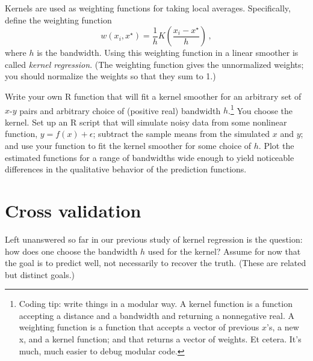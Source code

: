 \documentclass[11pt]{article}
\begin{document}
\begin{enumerate}[(A)]
Kernels are used as weighting functions for taking local averages.  Specifically, define the weighting function
$$
w(x_i, x^{\star}) = \frac{1}{h} K \left( \frac{x_i - x^{\star}}{h} \right)  \, ,
$$
where $h$ is the bandwidth.    Using this weighting function in a linear smoother is called \textit{kernel regression}.  (The weighting function gives the unnormalized weights; you should normalize the weights so that they sum to 1.)

Write your own R function that will fit a kernel smoother for an arbitrary set of $x$-$y$ pairs and arbitrary choice of (positive real) bandwidth $h$.\footnote{Coding tip: write things in a modular way.  A kernel function is a function accepting a distance and a bandwidth and returning a nonnegative real.  A weighting function is a function that accepts a vector of previous $x$'s, a new x, and a kernel function; and that returns a vector of weights.  Et cetera.  It's much, much easier to debug modular code.}  You choose the kernel.  Set up an R script that will simulate noisy data from some nonlinear function, $y = f(x) + \epsilon$; subtract the sample means from the simulated $x$ and $y$; and use your function to fit the kernel smoother for some choice of $h$. Plot the estimated functions for a range of bandwidths wide enough to yield noticeable differences in the qualitative behavior of the prediction functions.

\end{enumerate}

\section{Cross validation}

Left unanswered so far in our previous study of kernel regression is the question: how does one choose the bandwidth $h$ used for the kernel?  Assume for now that the goal is to predict well, not necessarily to recover the truth.  (These are related but distinct goals.)  
\end{document}
